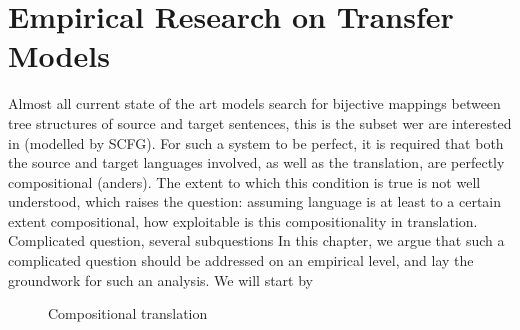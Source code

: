 \documentclass{report}
\author{}
\title{}
\theoremstyle{break}
\begin{document}
\tableofcontents

\chapter[3]{Empirical Research on Transfer Models}

Almost all current state of the art models search for bijective mappings between tree structures of source and target sentences, this is the subset wer are interested in (modelled by SCFG). For such a system to be perfect, it is required that both the source and target languages involved, as well as the translation, are perfectly compositional (anders). The extent to which this condition is true is not well understood, which raises the question: assuming language is at least to a certain extent compositional, how exploitable is this compositionality in translation. Complicated question, several subquestions
 In this chapter, we argue that such a complicated question should be addressed on an empirical level, and lay the groundwork for such an analysis. We will start by 

\begin{figure}[!ht]
\begin{framed}
\centering
{}
\end{framed}
\caption{Compositional translation}\label{fig:comptrans2}
\end{figure}
\end{document}
